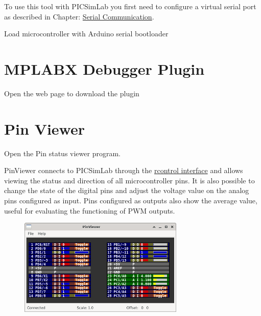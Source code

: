 To use this tool with PICSimLab you first need to configure a virtual serial port as described in Chapter: \hyperlink{def:seriali}{Serial Communication}.

Load microcontroller with Arduino serial bootloader 


\section{MPLABX Debugger Plugin} \hypertarget{def:mpdebug}{}

Open the web page to download the plugin 


\section{Pin Viewer} \hypertarget{def:pinv}{}

 Open the Pin status viewer program. 

 PinViewer connects to PICSimLab through the \hyperlink{def:rcontrol}{rcontrol interface} and allows viewing the status
 and direction of all microcontroller pins. It is also possible to change the state of the digital pins and adjust the
 voltage value on the analog pins configured as input. Pins configured as outputs also show the average value, useful 
 for evaluating the functioning of PWM outputs. 
 
\begin{figure}[H]
\center
\includegraphics[width=0.7\textwidth]{img/pinviewer.png} 
\end{figure} 
